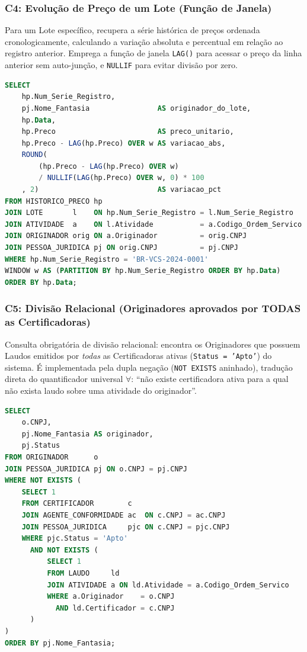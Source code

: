 \documentclass[12pt]{article}
\begin{document}
\subsubsection{C4: Evolução de Preço de um Lote (Função de Janela)}
Para um Lote específico, recupera a série histórica de preços ordenada cronologicamente, calculando a variação absoluta e percentual em relação ao registro anterior. Emprega a função de janela \texttt{LAG()} para acessar o preço da linha anterior sem auto-junção, e \texttt{NULLIF} para evitar divisão por zero.

\begin{lstlisting}[language=SQL, caption={C4: Evolução histórica de preço com variação percentual.}]
SELECT
    hp.Num_Serie_Registro,
    pj.Nome_Fantasia                AS originador_do_lote,
    hp.Data,
    hp.Preco                        AS preco_unitario,
    hp.Preco - LAG(hp.Preco) OVER w AS variacao_abs,
    ROUND(
        (hp.Preco - LAG(hp.Preco) OVER w)
        / NULLIF(LAG(hp.Preco) OVER w, 0) * 100
    , 2)                            AS variacao_pct
FROM HISTORICO_PRECO hp
JOIN LOTE       l    ON hp.Num_Serie_Registro = l.Num_Serie_Registro
JOIN ATIVIDADE  a    ON l.Atividade           = a.Codigo_Ordem_Servico
JOIN ORIGINADOR orig ON a.Originador          = orig.CNPJ
JOIN PESSOA_JURIDICA pj ON orig.CNPJ          = pj.CNPJ
WHERE hp.Num_Serie_Registro = 'BR-VCS-2024-0001'
WINDOW w AS (PARTITION BY hp.Num_Serie_Registro ORDER BY hp.Data)
ORDER BY hp.Data;
\end{lstlisting}

\subsubsection{C5: Divisão Relacional (Originadores aprovados por TODAS as Certificadoras)}
Consulta obrigatória de divisão relacional: encontra os Originadores que possuem Laudos emitidos por \textit{todas} as Certificadoras ativas (\texttt{Status = 'Apto'}) do sistema. É implementada pela dupla negação (\texttt{NOT EXISTS} aninhado), tradução direta do quantificador universal $\forall$: ``não existe certificadora ativa para a qual não exista laudo sobre uma atividade do originador''.

\begin{lstlisting}[language=SQL, caption={C5: Divisão relacional via NOT EXISTS aninhado.}]
SELECT
    o.CNPJ,
    pj.Nome_Fantasia AS originador,
    pj.Status
FROM ORIGINADOR      o
JOIN PESSOA_JURIDICA pj ON o.CNPJ = pj.CNPJ
WHERE NOT EXISTS (
    SELECT 1
    FROM CERTIFICADOR        c
    JOIN AGENTE_CONFORMIDADE ac  ON c.CNPJ = ac.CNPJ
    JOIN PESSOA_JURIDICA     pjc ON c.CNPJ = pjc.CNPJ
    WHERE pjc.Status = 'Apto'
      AND NOT EXISTS (
          SELECT 1
          FROM LAUDO     ld
          JOIN ATIVIDADE a ON ld.Atividade = a.Codigo_Ordem_Servico
          WHERE a.Originador    = o.CNPJ
            AND ld.Certificador = c.CNPJ
      )
)
ORDER BY pj.Nome_Fantasia;
\end{lstlisting}
\end{document}
